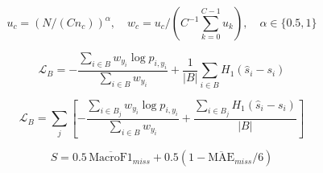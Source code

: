 \begin{equation}
u_c=(N/(C n_c))^\alpha,\quad w_c=u_c/(C^{-1}\sum_{k=0}^{C-1}u_k),\quad\alpha\in\{0.5,1\}\tag{1}
\end{equation}

\begin{equation}
\mathcal L_B=-\frac{\sum_{i\in B}w_{y_i}\log p_{i,y_i}}{\sum_{i\in B}w_{y_i}}+\frac{1}{|B|}\sum_{i\in B}H_1(\hat s_i-s_i)\tag{2}
\end{equation}

\begin{equation}
\mathcal L_B=\sum_j\left[-\frac{\sum_{i\in B_j}w_{y_i}\log p_{i,y_i}}{\sum_{i\in B}w_{y_i}}+\frac{\sum_{i\in B_j}H_1(\hat s_i-s_i)}{|B|}\right]\tag{3}
\end{equation}

\begin{equation}
S=0.5\,\overline{\mathrm{MacroF1}}_{miss}+0.5(1-\overline{\mathrm{MAE}}_{miss}/6)\tag{4}
\end{equation}